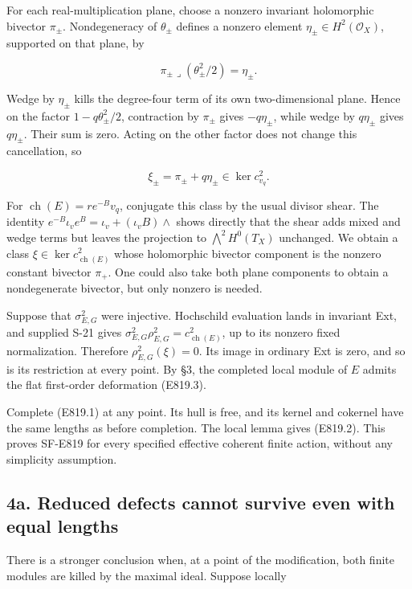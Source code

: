 For each real-multiplication plane, choose a nonzero invariant
holomorphic bivector \(\pi_\pm\). Nondegeneracy of \(\theta_\pm\)
defines a nonzero element \(\eta_\pm\in H^2(\mathcal O_X)\), supported
on that plane, by

\[
 \pi_\pm\mathbin{\lrcorner}(\theta_\pm^2/2)=\eta_\pm.
\]

Wedge by \(\eta_\pm\) kills the degree-four term of its own
two-dimensional plane. Hence on the factor \(1-q\theta_\pm^2/2\),
contraction by \(\pi_\pm\) gives \(-q\eta_\pm\), while wedge by
\(q\eta_\pm\) gives \(q\eta_\pm\). Their sum is zero. Acting on the
other factor does not change this cancellation, so

\[
 \xi_\pm=\pi_\pm+q\eta_\pm
       \in\ker c^2_{v_q}.
 \tag{E819.13}
\]

For \(\operatorname{ch}(E)=r e^{-B}v_q\), conjugate this class by the
usual divisor shear. The identity
\(e^{-B}\iota_v e^B=\iota_v+(\iota_vB)\wedge\) shows directly that the
shear adds mixed and wedge terms but leaves the projection to
\(\bigwedge^2H^0(T_X)\) unchanged. We obtain a class
\(\xi\in\ker c^2_{\operatorname{ch}(E)}\) whose holomorphic bivector
component is the nonzero constant bivector \(\pi_+\). One could also
take both plane components to obtain a nondegenerate bivector, but only
nonzero is needed.

Suppose that \(\sigma^2_{E,G}\) were injective. Hochschild evaluation
lands in invariant Ext, and supplied S-21 gives
\(\sigma^2_{E,G}\rho^2_{E,G}=c^2_{\operatorname{ch}(E)}\), up to its
nonzero fixed normalization. Therefore \(\rho^2_{E,G}(\xi)=0\). Its
image in ordinary Ext is zero, and so is its restriction at every point.
By §3, the completed local module of \(E\) admits the flat first-order
deformation (E819.3).

Complete (E819.1) at any point. Its hull is free, and its kernel and
cokernel have the same lengths as before completion. The local lemma
gives (E819.2). This proves SF-E819 for every specified effective
coherent finite action, without any simplicity assumption.

\subsection{4a. Reduced defects cannot survive even with equal
lengths}\label{SF-E819-a.-reduced-defects-cannot-survive-even-with-equal-lengths}

There is a stronger conclusion when, at a point of the modification,
both finite modules are killed by the maximal ideal. Suppose locally

